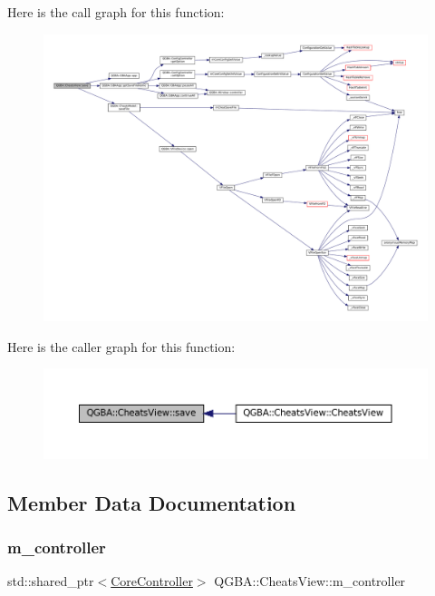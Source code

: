 Here is the call graph for this function\+:
\nopagebreak
\begin{figure}[H]
\begin{center}
\leavevmode
\includegraphics[width=350pt]{class_q_g_b_a_1_1_cheats_view_acc7c4f014670cccb752cde7ad6e85597_cgraph}
\end{center}
\end{figure}
Here is the caller graph for this function\+:
\nopagebreak
\begin{figure}[H]
\begin{center}
\leavevmode
\includegraphics[width=350pt]{class_q_g_b_a_1_1_cheats_view_acc7c4f014670cccb752cde7ad6e85597_icgraph}
\end{center}
\end{figure}


\subsection{Member Data Documentation}
\mbox{\label{class_q_g_b_a_1_1_cheats_view_a98ecbddbbc4d99e00628517f32f752b3}} 
\subsubsection{\texorpdfstring{m\+\_\+controller}{m\_controller}}
{\footnotesize\ttfamily std\+::shared\+\_\+ptr$<$\mbox{\hyperlink{class_q_g_b_a_1_1_core_controller}{Core\+Controller}}$>$ Q\+G\+B\+A\+::\+Cheats\+View\+::m\+\_\+controller\hspace{0.3cm}{\ttfamily [private]}}

